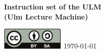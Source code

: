 \begin{titlepage}
   \begin{flushright}
      {\Huge \bfseries
	 Instruction set of the ULM\\
	 (Ulm Lecture Machine) \\
      }

      \vspace*{\fill}

      \href{https://creativecommons.org/licenses/by-sa/4.0/}
      {\includegraphics[width=3cm]{by-sa.pdf}}
      \hspace*{\fill}
      {\huge
	 \today \\
      }
   \end{flushright}
\end{titlepage}
